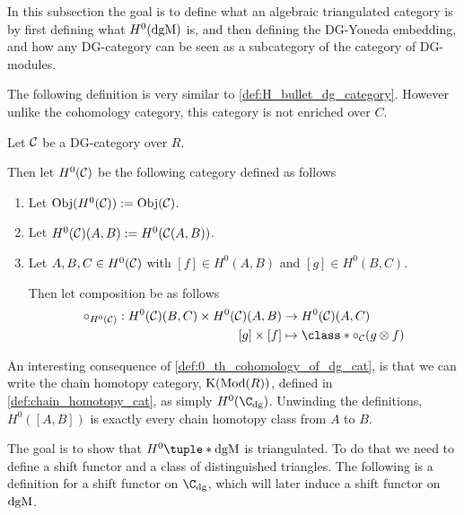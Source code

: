 In this subsection the goal is to define what an algebraic triangulated category is by first defining what \( H^0(\operatorname{dgM}) \) is, and then defining the DG-Yoneda embedding, and how any DG-category can be seen as a subcategory of the category of DG-modules.

The following definition is very similar to \autoref{def:H_bullet_dg_category}. However unlike the cohomology category, this category is not enriched over \( C \).

\begin{definition}
    \label{def:0_th_cohomology_of_dg_cat}
    Let \( {\mathcal{C}} \) be a DG-category over \( R \).

    Then let \( H^0({\mathcal{C}}) \) be the following category defined as follows
    \begin{enumerate}
        \item {
            Let \( \operatorname{Obj}(H^0({\mathcal{C}})) := \operatorname{Obj}({\mathcal{C}}) \).
        }
        \item {
            Let \( H^0({\mathcal{C}})(A, B) := H^0({\mathcal{C}}(A, B)) \).
        }
        \item {
            Let \( A, B, C \in H^0({\mathcal{C}}) \) with \( [f] \in H^0(A, B) \) and \( [g] \in H^0(B, C) \).

            Then let composition be as follows
            \begin{align*}
                \circ_{H^0(\Cc)}: H^0(\Cc)(B, C) \times H^0(\Cc)(A, B) &\to H^0(\Cc)(A, C) \\
                [g] \times [f] &\mapsto \class*{ \circ_{\Cc}(g \otimes f) }
            \end{align*}
        }
    \end{enumerate}
\end{definition}

An interesting consequence of \autoref{def:0_th_cohomology_of_dg_cat}, is that we can write the chain homotopy category, \( \operatorname{K}(\operatorname{Mod}(R)) \), defined in \autoref{def:chain_homotopy_cat}, as simply \( H^0(\C_{\dg}) \). Unwinding the definitions, \( H^0([A, B]) \) is exactly every chain homotopy class from \( A \) to \( B \).

The goal is to show that \( H^0\tuple*{\dgM} \) is triangulated. To do that we need to define a shift functor and a class of distinguished triangles. The following is a definition for a shift functor on \( \C_{\dg} \), which will later induce a shift functor on \( \operatorname{dgM} \).

